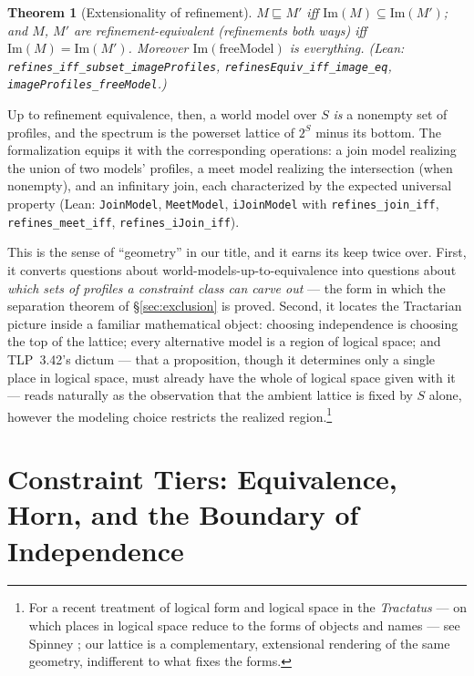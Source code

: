 \documentclass[10pt, letterpaper]{article}
\newtheorem{theorem}{Theorem}[section]
\theoremstyle{remark}
\newcommand{\lean}[1]{\texttt{#1}}
\newcommand{\TLP}[1]{TLP~#1}
\begin{document}
\begin{theorem}[Extensionality of refinement]\label{thm:image}
$M \sqsubseteq M'$ iff $\mathrm{Im}(M) \subseteq \mathrm{Im}(M')$; and $M$,
$M'$ are refinement-equivalent (refinements both ways) iff
$\mathrm{Im}(M) = \mathrm{Im}(M')$. Moreover
$\mathrm{Im}(\mathrm{freeModel})$ is everything. (Lean:
\lean{refines\_iff\_subset\_imageProfiles},
\lean{refinesEquiv\_iff\_image\_eq}, \lean{imageProfiles\_freeModel}.)
\end{theorem}

Up to refinement equivalence, then, a world model over $S$ \emph{is} a
nonempty set of profiles, and the spectrum is the powerset lattice of
$2^S$ minus its bottom. The formalization equips it with the corresponding
operations: a join model realizing the union of two models' profiles, a meet
model realizing the intersection (when nonempty), and an infinitary join,
each characterized by the expected universal property (Lean:
\lean{JoinModel}, \lean{MeetModel}, \lean{iJoinModel} with
\lean{refines\_join\_iff}, \lean{refines\_meet\_iff},
\lean{refines\_iJoin\_iff}).

This is the sense of ``geometry'' in our title, and it earns its keep twice
over. First, it converts questions about world-models-up-to-equivalence into
questions about \emph{which sets of profiles a constraint class can carve
out} --- the form in which the separation theorem of \S\ref{sec:exclusion}
is proved. Second, it locates the Tractarian picture inside a familiar
mathematical object: choosing independence is choosing the top of the
lattice; every alternative model is a region of logical space; and
\TLP{3.42}'s dictum --- that a proposition, though it determines only a
single place in logical space, must already have the whole of logical space
given with it \cite{wittgenstein1921} --- reads naturally as the observation
that the ambient lattice is fixed by $S$ alone, however the modeling choice
restricts the realized region.\footnote{For a recent treatment of logical
form and logical space in the \emph{Tractatus} --- on which places in
logical space reduce to the forms of objects and names --- see Spinney
\cite{spinney2022}; our lattice is a complementary, extensional rendering of
the same geometry, indifferent to what fixes the forms.}

\section{Constraint Tiers: Equivalence, Horn, and the Boundary of
  Independence}\label{sec:tiers}
\end{document}
